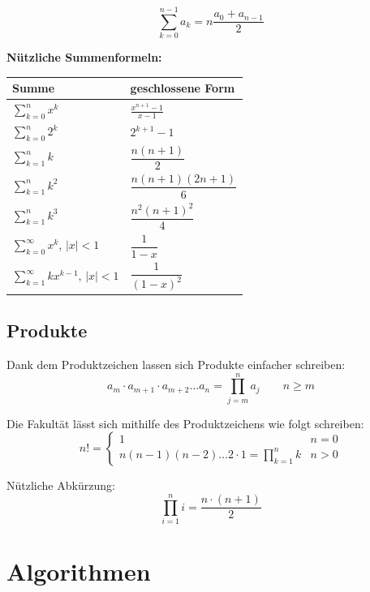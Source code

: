 \documentclass[12pt]{scrartcl}
\begin{document}
\[\sum_{k=0}^{n-1} a_k = n \frac{a_0 + a_{n-1}}{2}\]


\newpage
\textbf{Nützliche Summenformeln:}

\renewcommand{\arraystretch}{2.5}
\begin{center}
    \begin{tabular}{  m{10em} | P{10em} }
        \hline
        Summe & geschlossene Form \\
        \hline
        $\sum_{k=0}^{n} x^k$                        & $\frac{x^{n + 1} - 1}{x - 1}$               \\ 
        $\sum_{k=0}^{n} 2^k$                        & $2^{k + 1} - 1$               \\ 
        $\sum_{k=1}^{n} k$                          & $\dfrac{n(n + 1)}{2}$         \\ 
        $\sum_{k=1}^{n} k^2$                        & $\dfrac{n(n + 1)(2n + 1)}{6}$ \\ 
        $\sum_{k=1}^{n} k^3$                        & $\dfrac{n^2(n + 1)^2}{4}$     \\ 
        $\sum_{k=0}^{\infty} x^k$, $|x| < 1$        & $\dfrac{1}{1 - x}$            \\ 
        $\sum_{k=1}^{\infty} kx^{k-1}$, $|x| < 1$   & $\dfrac{1}{(1-x)^2}$          \\ 
        \hline
    \end{tabular}
\end{center}


\subsection{Produkte}
Dank dem Produktzeichen lassen sich Produkte einfacher schreiben:\\


\[a_m \cdot a_{m+1} \cdot a_{m+2} \dots a_n = \prod_{j=m}^{n} a_j \quad\quad n \geqslant m\]

Die Fakultät lässt sich mithilfe des Produktzeichens wie folgt schreiben:\\
\[n! = 
\begin{cases}
    1 & n=0 \\
    n(n - 1)(n - 2) \dots 2 \cdot 1 = \prod_{k=1}^{n}k & n > 0
\end{cases}\]


Nützliche Abkürzung:
\[\prod_{i=1}^{n} i = \frac{n \cdot (n + 1)}{2}\]


\newpage
\section{Algorithmen}
\end{document}
